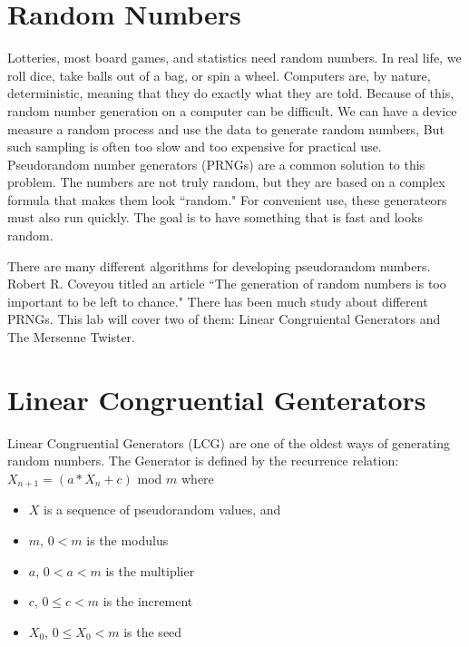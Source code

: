 \label{lab:PRNG}


\section*{Random Numbers}
Lotteries, most board games, and statistics need random numbers.
In real life, we roll dice, take balls out of a bag, or spin a wheel.
Computers are, by nature, deterministic, meaning that they do exactly what they are told.
Because of this, random number generation on a computer can be difficult.
We can have a device measure a random process and use the data to generate random numbers, 
But such sampling is often too slow and too expensive for practical use.
Pseudorandom number generators (PRNGs) are a common solution to this problem.
The numbers are not truly random, but they are based on a complex formula that makes them look ``random."
For convenient use, these generateors must also run quickly.
The goal is to have something that is fast and looks random.

There are many different algorithms for developing pseudorandom numbers.
Robert R. Coveyou titled an article ``The generation of random numbers is too important to be left to chance."
There has been much study about different PRNGs.
This lab will cover two of them: Linear Congruiental Generators and The Mersenne Twister.

\section*{Linear Congruential Genterators}
Linear Congruential Generators (LCG) are one of the oldest ways of generating random numbers.
The Generator is defined by the recurrence relation:
$X_{n+1}=(a*X_n + c)$ mod $m$ where

\begin{itemize}
\item $X$ is a sequence of pseudorandom values, and
\item $m$, $0<m$ is the modulus
\item $a$, $0<a<m$ is the multiplier
\item $c$, $0\leq c<m$ is the increment
\item $X_0$, $0\leq X_0 <m$ is the seed
\end{itemize}

